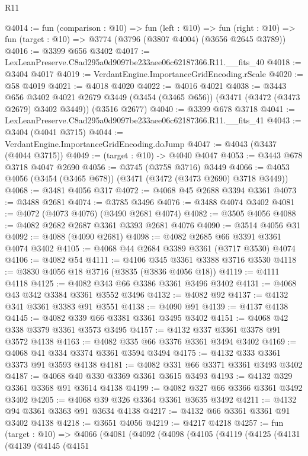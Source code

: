 \begin{lexlean}{R11}
\begin{coremodule}
@4014 := fun (comparison : @10) =>
  fun (left : @10) =>
  fun (right : @10) => fun (target : @10) => @3774 (@3796 (@3807 @4004) (@3656 @2645 @3789))
@4016 := @3399 @656 @3402
@4017 := LexLeanPreserve.C8ad295a0d9097be233aee06c62187366.R11.__fits_40
@4018 := @3404 @4017
@4019 := VerdantEngine.ImportanceGridEncoding.rScale
@4020 := @58 @4019
@4021 := @4018 @4020
@4022 := @4016 @4021
@4038 := @3443
    @656
    @3402
    @4021
    @2679
    @3449
    (@3454 (@3465 @656))
    (@3471 (@3472 (@3473 @2679) @3402 @3449))
    (@3516 @2677)
@4040 := @3399 @678 @3718
@4041 := LexLeanPreserve.C8ad295a0d9097be233aee06c62187366.R11.__fits_41
@4043 := @3404 (@4041 @3715)
@4044 := VerdantEngine.ImportanceGridEncoding.doJump
@4047 := @4043 (@3437 (@4044 @3715))
@4049 := (target : @10) -> @4040 @4047
@4053 := @3443 @678 @3718 @4047 @2690
@4056 := @3745 (@3758 @3716) @3449
@4066 := @4053 @4056 (@3454 (@3465 @678)) (@3471 (@3472 (@3473 @2690) @3718 @3449))
@4068 := @3481 @4056 @317
@4072 := @4068 @45 @2688 @3394 @3361
@4073 := @3488 @2681
@4074 := @3785 @3496
@4076 := @3488 @4074 @3402
@4081 := @4072 (@4073 @4076) (@3490 @2681 @4074)
@4082 := @3505 @4056
@4088 := @4082 @2682 @2687 @3361 @3393 @2681 @4076
@4090 := @3514 @4056 @31
@4092 := @4088 (@4090 @2681)
@4098 := @4082 @2685 @66 @3391 @3361 @4074 @3402
@4105 := @4068 @44 @2684 @3389 @3361 (@3717 @3530) @4074
@4106 := @4082 @54
@4111 := @4106 @345 @3361 @3388 @3716 @3530
@4118 := @3830 @4056 @18 @3716 (@3835 (@3836 @4056 @18))
@4119 := @4111 @4118
@4125 := @4082 @343 @66 @3386 @3361 @3496 @3402
@4131 := @4068 @43 @342 @3384 @3361 @3552 @3496
@4132 := @4082 @92
@4137 := @4132 @341 @3361 @3383 @91 @3551
@4138 := @4090 @91
@4139 := @4137 @4138
@4145 := @4082 @339 @66 @3381 @3361 @3495 @3402
@4151 := @4068 @42 @338 @3379 @3361 @3573 @3495
@4157 := @4132 @337 @3361 @3378 @91 @3572 @4138
@4163 := @4082 @335 @66 @3376 @3361 @3494 @3402
@4169 := @4068 @41 @334 @3374 @3361 @3594 @3494
@4175 := @4132 @333 @3361 @3373 @91 @3593 @4138
@4181 := @4082 @331 @66 @3371 @3361 @3493 @3402
@4187 := @4068 @40 @330 @3369 @3361 @3615 @3493
@4193 := @4132 @329 @3361 @3368 @91 @3614 @4138
@4199 := @4082 @327 @66 @3366 @3361 @3492 @3402
@4205 := @4068 @39 @326 @3364 @3361 @3635 @3492
@4211 := @4132 @94 @3361 @3363 @91 @3634 @4138
@4217 := @4132 @66 @3361 @3361 @91 @3402 @4138
@4218 := @3651 @4056
@4219 := @4217 @4218
@4257 := fun (target : @10) =>
  @4066
    (@4081
      (@4092
        (@4098
          (@4105
            (@4119
              (@4125
                (@4131
                  (@4139
                    (@4145
                      (@4151

\end{coremodule}
\end{lexlean}
